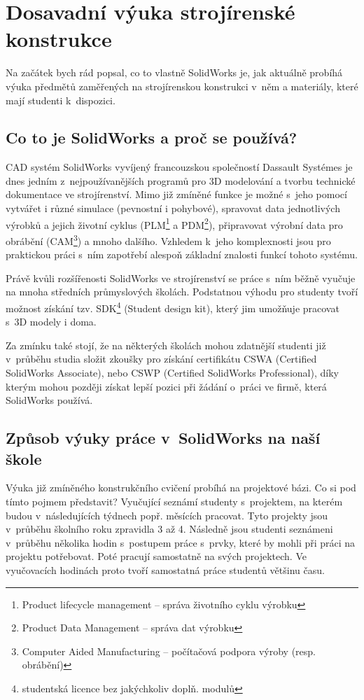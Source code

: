 \chapter{Dosavadní výuka strojírenské konstrukce}
Na začátek bych rád popsal, co to vlastně SolidWorks je, jak aktuálně probíhá výuka předmětů zaměřených na strojírenskou konstrukci v~něm a materiály, které mají studenti k~dispozici.

\section{Co to je SolidWorks a proč se používá?}
    CAD systém SolidWorks vyvíjený francouzskou společností Dassault Systémes je dnes jedním z~nejpoužívanějších programů pro 3D modelování a tvorbu technické dokumentace ve strojírenství.
    Mimo již zmíněné funkce je možné s~jeho pomocí vytvářet i různé simulace (pevnostní i pohybové), spravovat data jednotlivých výrobků a jejich životní cyklus (PLM\footnote{Product lifecycle management -- správa životního cyklu výrobku} a PDM\footnote{Product Data Management -- správa dat výrobku}), připravovat výrobní data pro obrábění (CAM\footnote{Computer Aided Manufacturing -- počítačová podpora výroby (resp. obrábění)}) a mnoho dalšího.
    Vzhledem k~jeho komplexnosti jsou pro praktickou práci s~ním zapotřebí alespoň základní znalosti funkcí tohoto systému.

    Právě kvůli rozšířenosti SolidWorks ve strojírenství se práce s~ním běžně vyučuje na mnoha středních průmyslových školách.
    Podstatnou výhodu pro studenty tvoří možnost získání tzv. SDK\footnote{studentská licence bez jakýchkoliv doplň. modulů} (Student design kit), který jim umožňuje pracovat s~3D modely i doma.

    Za zmínku také stojí, že na některých školách mohou zdatnější studenti již v~průběhu studia složit zkoušky pro získání certifikátu CSWA (Certified SolidWorks Associate), nebo CSWP (Certified SolidWorks Professional), díky kterým mohou později získat lepší pozici při žádání o~práci ve firmě, která SolidWorks používá.

\section{Způsob výuky práce v~SolidWorks na naší škole}
    Výuka již zmíněného konstrukčního cvičení probíhá na projektové bázi.
    Co si pod tímto pojmem představit?
    Vyučující seznámí studenty s~projektem, na kterém budou v~následujících týdnech popř. měsících pracovat. 
    Tyto projekty jsou v~průběhu školního roku zpravidla 3 až 4.
    Následně jsou studenti seznámeni v~průběhu několika hodin s~postupem práce s~prvky, které by mohli při práci na projektu potřebovat.
    Poté pracují samostatně na svých projektech.
    Ve vyučovacích hodinách proto tvoří samostatná práce studentů většinu času.

